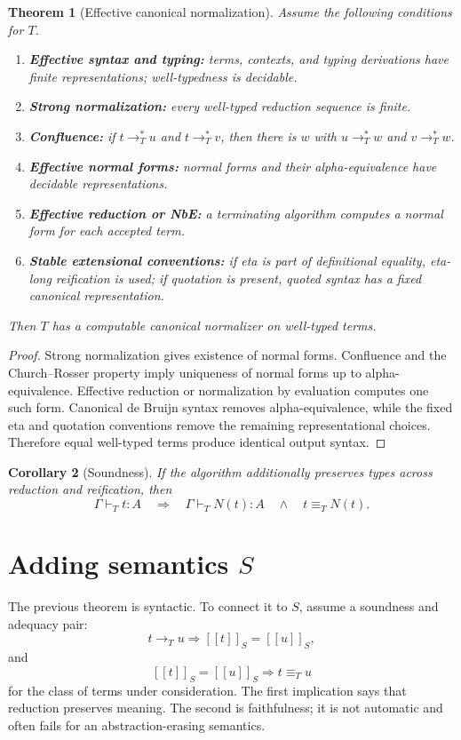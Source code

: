 \documentclass[11pt,a4paper]{article}
\newtheorem{theorem}{Theorem}[section]
\newtheorem{corollary}[theorem]{Corollary}
\newcommand{\llbracket}{[\![}
\newcommand{\rrbracket}{]\!]}
\begin{document}
\begin{theorem}[Effective canonical normalization]
Assume the following conditions for $T$.
\begin{enumerate}
\item \textbf{Effective syntax and typing:} terms, contexts, and typing derivations have finite representations; well-typedness is decidable.
\item \textbf{Strong normalization:} every well-typed reduction sequence is finite.
\item \textbf{Confluence:} if $t\to_T^*u$ and $t\to_T^*v$, then there is $w$ with $u\to_T^*w$ and $v\to_T^*w$.
\item \textbf{Effective normal forms:} normal forms and their alpha-equivalence have decidable representations.
\item \textbf{Effective reduction or NbE:} a terminating algorithm computes a normal form for each accepted term.
\item \textbf{Stable extensional conventions:} if eta is part of definitional equality, eta-long reification is used; if quotation is present, quoted syntax has a fixed canonical representation.
\end{enumerate}
Then $T$ has a computable canonical normalizer on well-typed terms.
\end{theorem}
\begin{proof}
Strong normalization gives existence of normal forms. Confluence and the Church--Rosser property imply uniqueness of normal forms up to alpha-equivalence. Effective reduction or normalization by evaluation computes one such form. Canonical de Bruijn syntax removes alpha-equivalence, while the fixed eta and quotation conventions remove the remaining representational choices. Therefore equal well-typed terms produce identical output syntax.
\end{proof}

\begin{corollary}[Soundness]
If the algorithm additionally preserves types across reduction and reification, then
\[
\Gamma\vdash_T t:A\quad\Longrightarrow\quad
\Gamma\vdash_T N(t):A\quad\land\quad t\equiv_TN(t).
\]
\end{corollary}

\section{Adding semantics $S$}
The previous theorem is syntactic. To connect it to $S$, assume a soundness and adequacy pair:
\[
t\to_Tu\Longrightarrow\llbracket t\rrbracket_S=\llbracket u\rrbracket_S,
\]
and
\[
\llbracket t\rrbracket_S=\llbracket u\rrbracket_S
\Longrightarrow t\equiv_Tu
\]
for the class of terms under consideration. The first implication says that reduction preserves meaning. The second is faithfulness; it is not automatic and often fails for an abstraction-erasing semantics.
\end{document}
